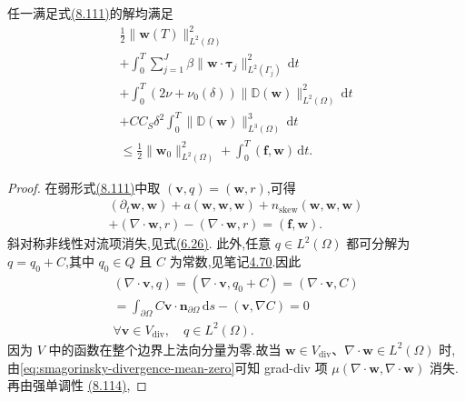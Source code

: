 \begin{lemma}[$\bm{w}$ 的能量不等式]
\label{lem:smagorinsky-strain-energy-inequality}
任一满足式\hyperref[eq:smagorinsky-generalized-weak-form]{(8.111)}的解均满足
\begin{equation}\label{eq:smagorinsky-strain-energy-inequality}
\begin{gathered}
 \frac12\|\bm{w}(T)\|_{L^2(\Omega)}^2\\
 +\int_0^T\sum_{j=1}^J\beta
      \|\bm{w}\cdot\symbf{\tau}_j\|_{L^2(\Gamma_j)}^2\,\mathrm{d}t\\
 +\int_0^T(2\nu+\nu_0(\delta))
      \|\mathbb{D}(\bm{w})\|_{L^2(\Omega)}^2\,\mathrm{d}t\\
 +C C_S\delta^2\int_0^T
      \|\mathbb{D}(\bm{w})\|_{L^3(\Omega)}^3\,\mathrm{d}t\\
 \le \frac12\|\bm{w}_0\|_{L^2(\Omega)}^2
      +\int_0^T(\bm{f},\bm{w})\,\mathrm{d}t.
\end{gathered}
\end{equation}
\begin{proof}
在弱形式\hyperref[eq:smagorinsky-generalized-weak-form]{(8.111)}中取
$(\bm{v},q)=(\bm{w},r)$,可得
\[
\begin{gathered}
 (\partial_t\bm{w},\bm{w})
  +a(\bm{w},\bm{w},\bm{w})
  +n_{\mathrm{skew}}(\bm{w},\bm{w},\bm{w})\\
 +(\nabla\cdot\bm{w},r)
  -(\nabla\cdot\bm{w},r)
  =(\bm{f},\bm{w}).
\end{gathered}
\]
斜对称非线性对流项消失,见式\hyperref[eq:steady-ns-convection-zero-rot-skew]{(6.26)}.
此外,任意 $q\in L^2(\Omega)$ 都可分解为 $q=q_0+C$,其中 $q_0\in Q$ 且
$C$ 为常数,见笔记\hyperref[note:stokes-standard-pressure-space]{4.70}.因此
\begin{equation}\label{eq:smagorinsky-divergence-mean-zero}
\begin{gathered}
 (\nabla\cdot\bm{v},q)
  =(\nabla\cdot\bm{v},q_0+C)
  =(\nabla\cdot\bm{v},C)\\
 =\int_{\partial\Omega}C\bm{v}\cdot\bm{n}_{\partial\Omega}\,\mathrm{d}s
   -(\bm{v},\nabla C)=0\\
 \forall\bm{v}\in V_{\mathrm{div}},\quad q\in L^2(\Omega).
\end{gathered}
\end{equation}
因为 $V$ 中的函数在整个边界上法向分量为零.故当
$\bm{w}\in V_{\mathrm{div}}$、$\nabla\cdot\bm{w}\in L^2(\Omega)$ 时,
由\cref{eq:smagorinsky-divergence-mean-zero}可知 grad-div 项
$\mu(\nabla\cdot\bm{w},\nabla\cdot\bm{w})$ 消失.再由强单调性
\hyperref[eq:smagorinsky-strain-strong-monotonicity]{(8.114)},

\end{proof}
\end{lemma}
